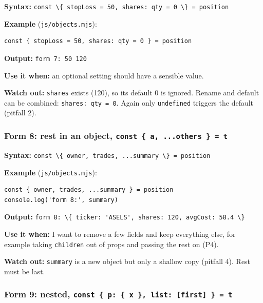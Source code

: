 \documentclass[
  11pt,
]{article}
\newcommand{\passthrough}[1]{#1}
\begin{document}
\textbf{Syntax:}
\passthrough{\lstinline!const \{ stopLoss = 50, shares: qty = 0 \} = position!}

\textbf{Example} (\passthrough{\lstinline!js/objects.mjs!}):

\begin{lstlisting}
const { stopLoss = 50, shares: qty = 0 } = position
\end{lstlisting}

\textbf{Output:} \passthrough{\lstinline!form 7: 50 120!}

\textbf{Use it when:} an optional setting should have a sensible value.

\textbf{Watch out:} \passthrough{\lstinline!shares!} exists (120), so
its default 0 is ignored. Rename and default can be combined:
\passthrough{\lstinline!shares: qty = 0!}. Again only
\passthrough{\lstinline!undefined!} triggers the default (pitfall 2).

\subsubsection{\texorpdfstring{Form 8: rest in an object,
\texttt{const\ \{\ a,\ ...others\ \}\ =\ t}}{Form 8: rest in an object, const \{ a, ...others \} = t}}\label{form-8-rest-in-an-object-const-a-...others-t}

\textbf{Syntax:}
\passthrough{\lstinline!const \{ owner, trades, ...summary \} = position!}

\textbf{Example} (\passthrough{\lstinline!js/objects.mjs!}):

\begin{lstlisting}
const { owner, trades, ...summary } = position
console.log('form 8:', summary)
\end{lstlisting}

\textbf{Output:}
\passthrough{\lstinline!form 8: \{ ticker: 'ASELS', shares: 120, avgCost: 58.4 \}!}

\textbf{Use it when:} I want to remove a few fields and keep everything
else, for example taking \passthrough{\lstinline!children!} out of props
and passing the rest on (P4).

\textbf{Watch out:} \passthrough{\lstinline!summary!} is a new object
but only a shallow copy (pitfall 4). Rest must be last.

\subsubsection{\texorpdfstring{Form 9: nested,
\texttt{const\ \{\ p:\ \{\ x\ \},\ list:\ {[}first{]}\ \}\ =\ t}}{Form 9: nested, const \{ p: \{ x \}, list: {[}first{]} \} = t}}\label{form-9-nested-const-p-x-list-first-t}
\end{document}
